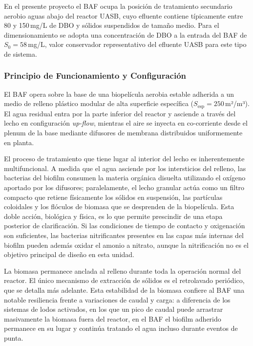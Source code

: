 \documentclass[12pt,a4paper]{article}
\begin{document}
En el presente proyecto el BAF ocupa la posición de tratamiento secundario aerobio aguas abajo del reactor UASB, cuyo efluente contiene típicamente entre 80 y 150\,mg/L de DBO y sólidos suspendidos de tamaño medio. Para el dimensionamiento se adopta una concentración de DBO a la entrada del BAF de $S_0 = 58$\,mg/L, valor conservador representativo del efluente UASB para este tipo de sistema.

\subsubsection*{Principio de Funcionamiento y Configuración}

El BAF opera sobre la base de una biopelícula aerobia estable adherida a un medio de relleno plástico modular de alta superficie específica ($S_{\text{esp}} = 250$\,m²/m³). El agua residual entra por la parte inferior del reactor y asciende a través del lecho en configuración \textit{up-flow}, mientras el aire se inyecta en co-corriente desde el plenum de la base mediante difusores de membrana distribuidos uniformemente en planta.

El proceso de tratamiento que tiene lugar al interior del lecho es inherentemente multifuncional. A medida que el agua asciende por los intersticios del relleno, las bacterias del biofilm consumen la materia orgánica disuelta utilizando el oxígeno aportado por los difusores; paralelamente, el lecho granular actúa como un filtro compacto que retiene físicamente los sólidos en suspensión, las partículas coloidales y los flóculos de biomasa que se desprenden de la biopelícula. Esta doble acción, biológica y física, es lo que permite prescindir de una etapa posterior de clarificación. Si las condiciones de tiempo de contacto y oxigenación son suficientes, las bacterias nitrificantes presentes en las capas más internas del biofilm pueden además oxidar el amonio a nitrato, aunque la nitrificación no es el objetivo principal de diseño en esta unidad.

La biomasa permanece anclada al relleno durante toda la operación normal del reactor. El único mecanismo de extracción de sólidos es el retrolavado periódico, que se detalla más adelante. Esta estabilidad de la biomasa confiere al BAF una notable resiliencia frente a variaciones de caudal y carga: a diferencia de los sistemas de lodos activados, en los que un pico de caudal puede arrastrar masivamente la biomasa fuera del reactor, en el BAF el biofilm adherido permanece en su lugar y continúa tratando el agua incluso durante eventos de punta.
\end{document}

